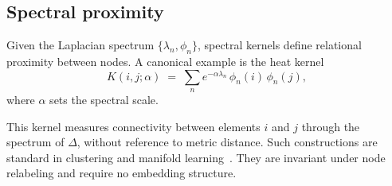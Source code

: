 \subsection{Spectral proximity}
  \label{subsec:spectral-proximity}

  Given the Laplacian spectrum $\{\lambda_n, \phi_n\}$, spectral kernels define
  relational proximity between nodes.
  A canonical example is the heat kernel
  \begin{equation}
    K(i,j;\alpha)
    \;=\;
    \sum_{n} e^{-\alpha \lambda_n}\,\phi_n(i)\,\phi_n(j),
  \end{equation}
  where $\alpha$ sets the spectral scale.

  This kernel measures connectivity between elements $i$ and $j$
  through the spectrum of $\Delta$, without reference to metric distance.
  Such constructions are standard in clustering and manifold learning~\cite{VonLuxburg2007}.
  They are invariant under node relabeling and require no embedding structure.
